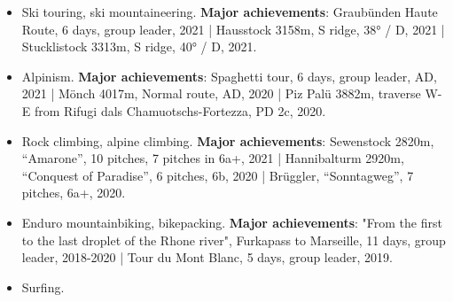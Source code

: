 %
%
%

{\begin{skills}
\end{skills}}

\vspace{1em}
\vspace{1em}
\begin{itemize}
	\item Ski touring, ski mountaineering. \textbf{Major achievements}: Graubünden Haute Route, 6 days, group leader, 2021 | Hausstock 3158m, S ridge, 38° / D, 2021 | Stucklistock 3313m, S ridge, 40° / D, 2021.
	\item Alpinism. \textbf{Major achievements}: Spaghetti tour, 6 days, group leader, AD, 2021 | Mönch 4017m, Normal route, AD, 2020 | Piz Palü 3882m, traverse W-E from Rifugi dals Chamuotschs-Fortezza, PD 2c, 2020.
    \item Rock climbing, alpine climbing. \textbf{Major achievements}: Sewenstock 2820m, “Amarone”, 10 pitches, 7 pitches in 6a+, 2021 | Hannibalturm 2920m, “Conquest of Paradise”, 6 pitches, 6b, 2020 | Brüggler, “Sonntagweg”, 7 pitches, 6a+, 2020.
	\item Enduro mountainbiking, bikepacking. \textbf{Major achievements}: "From the first to the last droplet of the Rhone river", Furkapass to Marseille, 11 days, group leader, 2018-2020 | Tour du Mont Blanc, 5 days, group leader, 2019.
    \item Surfing.
\end{itemize}